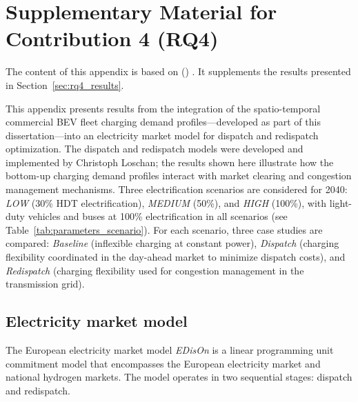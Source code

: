 \chapter{Supplementary Material for Contribution 4 (RQ4)}\label{app:rq4}

The content of this appendix is based on \citeauthor{GOLAB2025134385} (\citeyear{GOLAB2025134385}) \cite{GOLAB2025134385}. It supplements the results presented in Section~\ref{sec:rq4_results}.

This appendix presents results from the integration of the spatio-temporal commercial \ac{BEV} fleet charging demand profiles---developed as part of this dissertation---into an electricity market model for dispatch and redispatch optimization. The dispatch and redispatch models were developed and implemented by Christoph Loschan; the results shown here illustrate how the bottom-up charging demand profiles interact with market clearing and congestion management mechanisms. Three electrification scenarios are considered for 2040: \textit{LOW} (30\% \ac{HDT} electrification), \textit{MEDIUM} (50\%), and \textit{HIGH} (100\%), with light-duty vehicles and buses at 100\% electrification in all scenarios (see Table~\ref{tab:parameters_scenario}). For each scenario, three case studies are compared: \textit{Baseline} (inflexible charging at constant power), \textit{Dispatch} (charging flexibility coordinated in the day-ahead market to minimize dispatch costs), and \textit{Redispatch} (charging flexibility used for congestion management in the transmission grid).

\section{Electricity market model}\label{app:rq4_market_model}

The European electricity market model \textit{EDisOn} \citep{LOSCHAN2023108802,LOSCHAN2024109992} is a linear programming unit commitment model that encompasses the European electricity market and national hydrogen markets. The model operates in two sequential stages: dispatch and redispatch.


